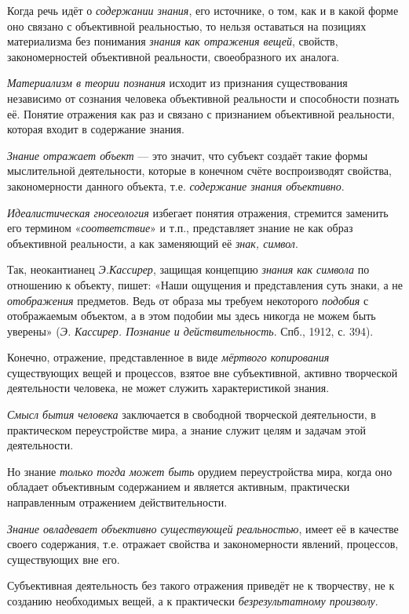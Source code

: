 \documentclass[a4paper,14pt,russian]{extreport}
\begin{document}
Когда речь идёт о \emph{содержании знания}, его источнике, о том, как и в какой форме оно связано с объективной реальностью, то нельзя оставаться на позициях материализма без понимания \emph{знания как отражения вещей}, свойств, закономерностей объективной реальности, своеобразного их аналога.

\emph{Материализм в теории познания} исходит из признания существования независимо от сознания человека объективной реальности и способности познать её. Понятие отражения как раз и связано с признанием объективной реальности, которая входит в содержание знания.

\emph{Знание отражает объект} --- это значит, что субъект создаёт такие формы мыслительной деятельности, которые в конечном счёте воспроизводят свойства, закономерности данного объекта, т.е. \emph{содержание знания объективно}.

\emph{Идеалистическая гносеология} избегает понятия отражения, стремится заменить его термином «\emph{соответствие}» и т.п., представляет знание не как образ объективной реальности, а как заменяющий её \emph{знак, символ}.

Так, неокантианец \emph{Э.Кассирер}, защищая концепцию \emph{знания как символа} по отношению к объекту, пишет: «Наши ощущения и представления суть знаки, а не \emph{отображения} предметов. Ведь от образа мы требуем некоторого \emph{подобия} с отображаемым объектом, а в этом подобии мы здесь никогда не можем быть уверены» (\emph{Э.} \emph{Кассирер. Познание и действительность}. Спб., 1912, с. 394).

Конечно, отражение, представленное в виде \emph{мёртвого копирования} существующих вещей и процессов, взятое вне субъективной, активно творческой деятельности человека, не может служить характеристикой знания.

\emph{Смысл бытия человека} заключается в свободной творческой деятельности, в практическом переустройстве мира, а знание служит целям и задачам этой деятельности.

Но знание \emph{только тогда может быть} орудием переустройства мира, когда оно обладает объективным содержанием и является активным, практически направленным отражением действительности.

\emph{Знание овладевает объективно существующей реальностью}, имеет её в качестве своего содержания, т.е. отражает свойства и закономерности явлений, процессов, существующих вне его.

Субъективная деятельность без такого отражения приведёт не к творчеству, не к созданию необходимых вещей, а к практически \emph{безрезультатному произволу}.
\end{document}

